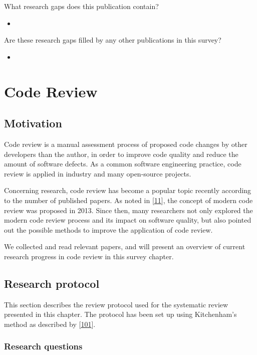 \documentclass[]{book}
\begin{document}
What research gaps does this publication contain?

\begin{itemize}
\item
\end{itemize}

Are these research gaps filled by any other publications in this survey?

\begin{itemize}
\item
\end{itemize}

\chapter{Code Review}\label{code-review}

\section{Motivation}\label{motivation-5}

Code review is a manual assessment process of proposed code changes by
other developers than the author, in order to improve code quality and
reduce the amount of software defects. As a common software engineering
practice, code review is applied in industry and many open-source
projects.

Concerning research, code review has become a popular topic recently
according to the number of published papers. As noted in
{[}\protect\hyperlink{ref-bacchelli2013expectations}{11}{]}, the concept
of modern code review was proposed in 2013. Since then, many researchers
not only explored the modern code review process and its impact on
software quality, but also pointed out the possible methods to improve
the application of code review.

We collected and read relevant papers, and will present an overview of
current research progress in code review in this survey chapter.

\section{Research protocol}\label{research-protocol-5}

This section describes the review protocol used for the systematic
review presented in this chapter. The protocol has been set up using
Kitchenham's method as described by
{[}\protect\hyperlink{ref-kitchenham2007}{101}{]}.

\subsection{Research questions}\label{research-questions-2}
\end{document}
